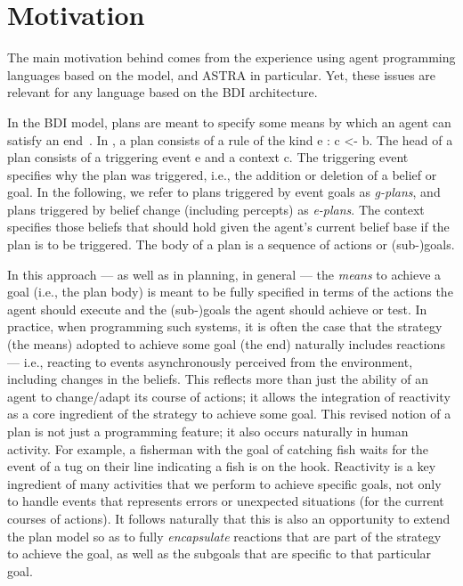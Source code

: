 \section{Motivation}
\label{sec:motivation}


The main motivation behind {\aser} comes from the experience using
agent programming languages based on the {\asl} model, {\jason} and
ASTRA in particular.
Yet, these issues are relevant for any language based on the BDI
architecture.

%
In the BDI model, plans are meant to specify some means by which an
agent can satisfy an end~\cite{Rao96}.
%
In {\asl}, a plan consists of a rule of the kind \textsf{e : c <- b}.
%
The head of a plan consists of a triggering event \textsf{e} and a
context \textsf{c}.
%
The triggering event specifies why the plan was triggered, i.e., the
addition or deletion of a belief or goal.
%
In the following, we refer to plans triggered by event goals
as \emph{g-plans}, and plans triggered by
belief change (including percepts) as \emph{e-plans}.
%
The context specifies those beliefs that should hold given the agent's
current belief base if the plan is to be triggered.
%
The body of a plan is a sequence of actions or (sub-)goals.
%

%
%
In this approach --- as well as in planning, in general --- the
\emph{means} to achieve a goal (i.e., the plan body) is meant to be
fully specified in terms of the actions the agent should execute and
the (sub-)goals the agent should achieve or test.
%
In practice, when programming such systems, it is often the case that
the strategy (the means) adopted to achieve some goal (the end)
naturally includes reactions --- i.e., reacting to events asynchronously
perceived from the environment, including changes in the beliefs.
% 
This reflects more than just the ability of an agent to change/adapt
its course of actions; it allows the integration of reactivity as a
core ingredient of the strategy to achieve some goal.
%
This revised notion of a plan is not just a programming feature; it
also occurs naturally in human activity. For example, a fisherman with
the goal of catching fish waits for the event of a tug on their line
indicating a fish is on the hook. Reactivity is a key ingredient of many
activities that we perform to achieve specific goals, not only to
handle events that represents errors or unexpected situations (for the
current courses of actions).
%
It follows naturally that this is also an opportunity to extend the
plan model so as to fully \emph{encapsulate} reactions that are
part of the strategy to achieve the goal, as well as the subgoals that
are specific to that particular goal.

